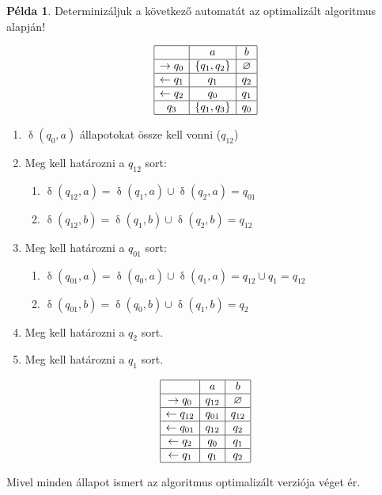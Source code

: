 \documentclass[a4paper,12pt]{article}
\theoremstyle{definition}
\newtheorem*{example}{Példa}
\DeclareMathOperator{\tr}{\delta}
\begin{document}
	\begin{example}
	Determinizáljuk a következő automatát az optimalizált algoritmus alapján!
	\begin{table}[H]
		\centering
		$$
		\begin{array}{|c|c|c|}
			\hline
			& a & b \\
			\hline
			\rightarrow q_0 & \left\lbrace q_1, q_2 \right\rbrace & \varnothing \\
			\hline
			\leftarrow q_1 & q_1 &  q_2 \\
			\hline
			\leftarrow q_2 & q_0 & q_1   \\
			\hline
			q_3 & \left\lbrace q_1, q_3 \right\rbrace  & q_0 \\
			\hline
		\end{array}
		$$
	\end{table}
	\begin{enumerate}
		\item $ \tr(q_0,a) $ állapotokat össze kell vonni ($ q_{12} $)
		
		\item Meg kell határozni a $q_{12}$ sort:
		\begin{enumerate}
			\item $ \tr(q_{12},a) = \tr(q_{1},a) \cup \tr(q_{2},a) = q_{01} $
			\item $ \tr(q_{12},b) = \tr(q_{1},b) \cup \tr(q_{2},b) = q_{12} $
		\end{enumerate}
	
		\item Meg kell határozni a $q_{01}$ sort:
		\begin{enumerate}
			\item $ \tr(q_{01},a) = \tr(q_{0},a) \cup \tr(q_{1},a) = q_{12} \cup q_{1} =  q_{12} $
			\item $ \tr(q_{01},b) = \tr(q_{0},b) \cup \tr(q_{1},b) = q_{2} $
		\end{enumerate}
	
		\item Meg kell határozni a $q_{2}$ sort.
		\item Meg kell határozni a $q_{1}$ sort.
	\end{enumerate}
	\begin{table}[H]
		\centering
		$$
		\begin{array}{|c|c|c|}
			\hline
			& a & b \\
			\hline
			\rightarrow q_0 & q_{12} & \varnothing \\
			\hline
			\leftarrow q_{12} & q_{01} & q_{12}  \\
			\hline
			\leftarrow q_{01} & q_{12} & q_2   \\
			\hline
			\leftarrow q_{2} & q_0 & q_1   \\
			\hline
			\leftarrow q_{1} & q_1 & q_2   \\
			\hline
		\end{array}
		$$
	\end{table}
	Mivel minden állapot ismert az algoritmus optimalizált verziója véget ér.
	\end{example}
	
\end{document}

